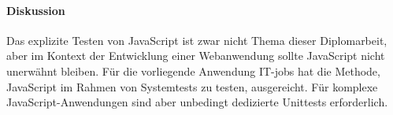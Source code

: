 \paragraph{Diskussion} Das explizite Testen von JavaScript ist zwar nicht Thema dieser Diplomarbeit, aber im Kontext der Entwicklung einer Webanwendung sollte JavaScript nicht unerwähnt bleiben. Für die vorliegende Anwendung IT-jobs hat die Methode, JavaScript im Rahmen von Systemtests zu testen, ausgereicht. Für komplexe JavaScript-Anwendungen sind aber unbedingt dedizierte Unittests erforderlich.

